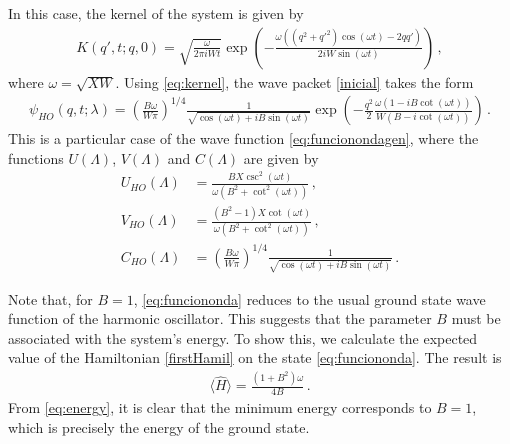 \documentclass[12pt]{iopart}
\begin{document}
In this case, the kernel of the system is given by
\begin{align}\label{eq:kernel}
K(q',t;q,0)= \sqrt{\frac{\omega}{2\pi i W t}}\exp{\left(-\frac{\omega((q^2+q'^2)\cos \left( \omega t \right) -2qq')}{2iW\sin \left( \omega t \right)}\right)}\,,
\end{align}
where $\omega=\sqrt{ XW }$. Using \eqref{eq:kernel}, the wave packet \eqref{inicial} takes the form
\begin{align}
\psi_{HO}(q,t;\lambda)=\left( \frac{B \omega}{W \pi} \right)^{1/4} \frac{1}{\sqrt{\cos \left( \omega t \right)+i
   B \sin \left( \omega t \right)}}  \exp \left(- \frac{q^2}{2}\frac{ \omega\left(1-i B \cot\left( \omega t \right)\right)}{W \left(B-i \cot \left( \omega t \right)\right)}\right)\,.
   \label{eq:funciononda}
\end{align}
 This is a particular case of the wave function \eqref{eq:funcionondagen}, where the functions $U(\Lambda)$, $V(\Lambda)$ and $C(\Lambda)$ are given by
\begin{subequations}
\begin{align}
    U_{HO}(\Lambda)&=\frac{B X \csc^2 \left( \omega t \right)}{\omega  \left(B^2+\cot ^2 \left( \omega t \right) \right)}\,,\\
    V_{HO}(\Lambda)&= \frac{\left(B^2-1\right) X \cot \left( \omega t \right)}{\omega  \left(B^2+\cot^2 \left( \omega t \right)\right)}\,,\\
    C_{HO}(\Lambda)&=\left( \frac{B \omega}{W \pi} \right)^{1/4} \frac{1}{\sqrt{\cos \left( \omega t \right)+i
   B \sin \left( \omega t \right)}}\,.
\end{align}
\label{UVCHO}
\end{subequations}

Note that, for $B=1$, \eqref{eq:funciononda} reduces to the usual ground state wave function of the harmonic oscillator. This suggests that the parameter $B$ must be associated with the system's energy. To show this, we calculate the expected value of the Hamiltonian \eqref{firstHamil} on the state \eqref{eq:funciononda}. The result is
\begin{align}\label{eq:energy}
\langle \hat{H}\rangle =\frac{(1+B^2)\omega}{4B}\,.
\end{align}
From \eqref{eq:energy}, it is clear that the minimum energy corresponds to  $B=1$, which is precisely the energy of the ground state. 
\end{document}
